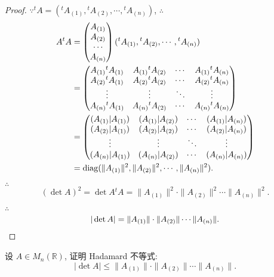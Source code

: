 \documentclass[color=black,device=normal,lang=cn,mode=geye]{elegantnote}
\begin{document}
\begin{proof}
    $\because{}^tA=({}^tA_{(1)},{}^tA_{(2)},\cdots,{}^tA_{(n)})$, $\therefore$
    \begin{align*}
        A{}^tA & =\begin{pmatrix}
            A_{(1)} \\
            A_{(2)} \\
            \cdots \\
            A_{(n)} \\
        \end{pmatrix}({}^tA_{(1)},{}^tA_{(2)},\cdots,{}^tA_{(n)}) \\
        & =\begin{pmatrix}
            A_{(1)}{}^tA_{(1)} & A_{(1)}{}^tA_{(2)} & \cdots & A_{(1)}{}^tA_{(n)} \\
            A_{(2)}{}^tA_{(1)} & A_{(2)}{}^tA_{(2)} & \cdots & A_{(2)}{}^tA_{(n)} \\
            \vdots  & \vdots  & \ddots & \vdots \\
            A_{(n)}{}^tA_{(1)} & A_{(n)}{}^tA_{(2)} & \cdots & A_{(n)}{}^tA_{(n)} \\
        \end{pmatrix} \\
        & =\begin{pmatrix}
            (A_{(1)}|A_{(1)}) & (A_{(1)}|A_{(2)}) & \cdots & (A_{(1)}|A_{(n)}) \\
            (A_{(2)}|A_{(1)}) & (A_{(2)}|A_{(2)}) & \cdots & (A_{(2)}|A_{(n)}) \\
            \vdots  & \vdots  & \ddots & \vdots \\
            (A_{(n)}|A_{(1)}) & (A_{(n)}|A_{(2)}) & \cdots & (A_{(n)}|A_{(n)}) \\
        \end{pmatrix} \\
        & =\operatorname{diag} (\|A_{(1)}\|^2,\|A_{(2)}\|^2,\cdots,\|A_{(n)}\|^2).
    \end{align*}

    $\therefore$
    \[(\det A)^2=\det A{}^tA=\|A_{(1)}\|^2\cdot\|A_{(2)}\|^2\cdots\|A_{(n)}\|^2.\]

    $\therefore$
    \[|\det A|=\|A_{(1)}\|\cdot\|A_{(2)}\|\cdots\|A_{(n)}\|.\qedhere\]
\end{proof}
\begin{exercise}%
    设 $A\in M_n(\mathbb{R})$, 证明 Hadamard 不等式:
    \[|\det A|\leq\|A_{(1)}\|\cdot\|A_{(2)}\|\cdots\|A_{(n)}\|.\]
\end{exercise}
\end{document}
